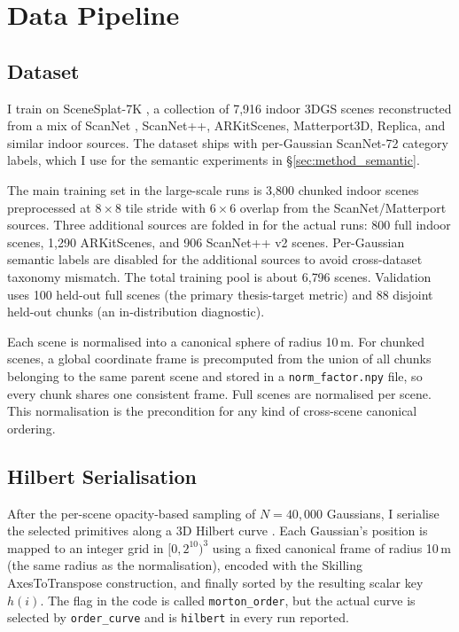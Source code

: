 \section{Data Pipeline}
\label{sec:method_data}

\subsection{Dataset}
\label{sec:method_dataset}

I train on SceneSplat-7K \citep{li2025scenesplat}, a collection of 7{,}916 indoor 3DGS scenes reconstructed from a mix of ScanNet \citep{dai2017scannet}, ScanNet++, ARKitScenes, Matterport3D, Replica, and similar indoor sources. The dataset ships with per-Gaussian ScanNet-72 category labels, which I use for the semantic experiments in \S\ref{sec:method_semantic}.

The main training set in the large-scale runs is 3{,}800 chunked indoor scenes preprocessed at $8\times8$ tile stride with $6\times6$ overlap from the ScanNet/Matterport sources. Three additional sources are folded in for the actual runs: 800 full indoor scenes, 1{,}290 ARKitScenes, and 906 ScanNet++ v2 scenes. Per-Gaussian semantic labels are disabled for the additional sources to avoid cross-dataset taxonomy mismatch. The total training pool is about 6{,}796 scenes. Validation uses 100 held-out full scenes (the primary thesis-target metric) and 88 disjoint held-out chunks (an in-distribution diagnostic).

Each scene is normalised into a canonical sphere of radius 10\,m. For chunked scenes, a global coordinate frame is precomputed from the union of all chunks belonging to the same parent scene and stored in a \texttt{norm\_factor.npy} file, so every chunk shares one consistent frame. Full scenes are normalised per scene. This normalisation is the precondition for any kind of cross-scene canonical ordering.

\subsection{Hilbert Serialisation}
\label{sec:method_hilbert}

After the per-scene opacity-based sampling of $N = 40{,}000$ Gaussians, I serialise the selected primitives along a 3D Hilbert curve \citep{skilling2004hilbert}. Each Gaussian's position is mapped to an integer grid in $[0, 2^{10})^3$ using a fixed canonical frame of radius 10\,m (the same radius as the normalisation), encoded with the Skilling AxesToTranspose construction, and finally sorted by the resulting scalar key $h(i)$. The flag in the code is called \texttt{morton\_order}, but the actual curve is selected by \texttt{order\_curve} and is \texttt{hilbert} in every run reported.

